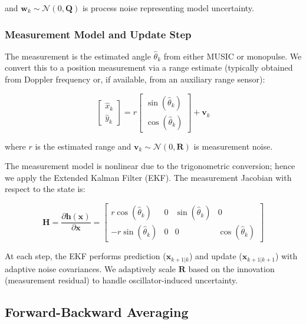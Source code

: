\documentclass[10pt,a4paper]{article}
\begin{document}
and $\mathbf{w}_k \sim \mathcal{N}(0, \mathbf{Q})$ is process noise representing model uncertainty.

\subsubsection{Measurement Model and Update Step}

The measurement is the estimated angle $\hat{\theta}_k$ from either MUSIC or monopulse. We convert this to
a position measurement via a range estimate (typically obtained from Doppler frequency or, if available, from
an auxiliary range sensor):

\begin{equation}
\begin{bmatrix} \hat{x}_k \\ \hat{y}_k \end{bmatrix} = r \begin{bmatrix} \sin(\hat{\theta}_k) \\ \cos(\hat{\theta}_k) \end{bmatrix} + \mathbf{v}_k
\label{eq:measurement}
\end{equation}

where $r$ is the estimated range and $\mathbf{v}_k \sim \mathcal{N}(0, \mathbf{R})$ is measurement noise.

The measurement model is nonlinear due to the trigonometric conversion; hence we apply the Extended Kalman Filter (EKF).
The measurement Jacobian with respect to the state is:

\begin{equation}
\mathbf{H} = \frac{\partial \mathbf{h}(\mathbf{x})}{\partial \mathbf{x}} = \begin{bmatrix} r \cos(\hat{\theta}_k) & 0 & \sin(\hat{\theta}_k) & 0 \\ -r \sin(\hat{\theta}_k) & 0 & 0 & \cos(\hat{\theta}_k) \end{bmatrix}
\label{eq:measurement_jacobian}
\end{equation}

At each step, the EKF performs prediction ($\mathbf{x}_{k+1|k}$) and update ($\mathbf{x}_{k+1|k+1}$) with adaptive
noise covariances. We adaptively scale $\mathbf{R}$ based on the innovation (measurement residual) to handle
oscillator-induced uncertainty.

\subsection{Forward-Backward Averaging}
\end{document}
